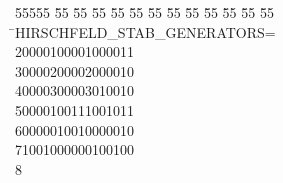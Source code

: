%
%
\begin{tabbing}
55555 \= 55 \= 55 \= 55 \= 55 \= 55 \= 55 \= 55 \= 55 \= 55 \= 55 \= 55 \= 55 \= \>HIRSCHFELD\_STAB\_GENERATORS=\\[0pt]
20000100001000011\ \\[0pt]
30000200002000010\ \\[0pt]
40000300003010010\ \\[0pt]
50000100111001011\ \\[0pt]
60000010010000010\ \\[0pt]
71001000000100100\\[0pt]
8\>\end{tabbing}
